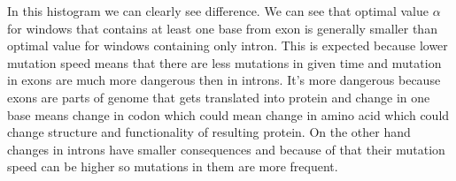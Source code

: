 \documentclass[a4paper]{article}
\begin{document}
	In this histogram we can clearly see difference. We can see that optimal value $\alpha$ for windows that contains at least one base from exon is generally smaller than optimal value for windows containing only intron. This is expected because lower mutation speed means that there are less mutations in given time and mutation in exons are much more dangerous then in introns. It's more dangerous because exons are parts of genome that gets translated into protein and change in one base means change in codon which could mean change in amino acid which could change structure and functionality of resulting protein. On the other hand changes in introns have smaller consequences and because of that their mutation speed can be higher so mutations in them are more frequent. 
\end{document}

